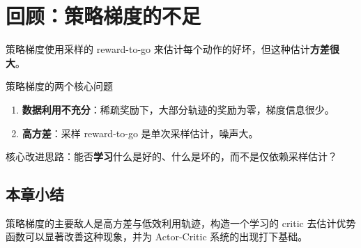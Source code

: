 \section{回顾：策略梯度的不足}

策略梯度使用采样的 reward-to-go 来估计每个动作的好坏，但这种估计\textbf{方差很大}。

\begin{warningbox}{策略梯度的两个核心问题}
\begin{enumerate}
    \item \textbf{数据利用不充分}：稀疏奖励下，大部分轨迹的奖励为零，梯度信息很少。
    \item \textbf{高方差}：采样 reward-to-go 是单次采样估计，噪声大。
\end{enumerate}
\end{warningbox}

核心改进思路：能否\textbf{学习}什么是好的、什么是坏的，而不是仅依赖采样估计？

\subsection{本章小结}

策略梯度的主要敌人是高方差与低效利用轨迹，构造一个学习的 critic 去估计优势函数可以显著改善这种现象，并为 Actor-Critic 系统的出现打下基础。


